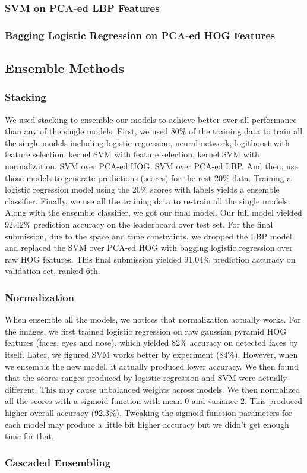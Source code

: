 \subsubsection{SVM on PCA-ed LBP Features}
\subsubsection{Bagging Logistic Regression on PCA-ed HOG Features}
\subsection{Ensemble Methods}
\subsubsection{Stacking}
We used stacking to ensemble our models to achieve better over all performance than any of the single models. First, we used 80\% of the training data to train all the single models including logistic regression, neural network, logitboost with feature selection, kernel SVM with feature selection, kernel SVM with normalization, SVM over PCA-ed HOG, SVM over PCA-ed LBP. And then, use those models to generate predictions (scores) for the rest 20\% data. Training a logistic regression model using the 20\% scores with labels yields a ensemble classifier. Finally, we use all the training data to re-train all the single models. Along with the ensemble classifier, we got our final model. Our full model yielded 92.42\% prediction accuracy on the leaderboard over test set. For the final submission, due to the space and time constraints, we dropped the LBP model and replaced the SVM over PCA-ed HOG with bagging logistic regression over raw HOG features. This final submission yielded 91.04\% prediction accuracy on validation set, ranked 6th.
\subsubsection{Normalization}
When ensemble all the models, we notices that normalization actually works. For the images, we first trained logistic regression on raw gaussian pyramid HOG features (faces, eyes and nose), which yielded 82\% accuracy on detected faces by itself. Later, we figured SVM works better by experiment (84\%). However, when we ensemble the new model, it actually produced lower accuracy. We then found that the scores ranges produced by logistic regression and SVM were actually different. This may cause unbalanced weights across models. We then normalized all the scores with a sigmoid function with mean 0 and variance 2. This produced higher overall accuracy (92.3\%). Tweaking the sigmoid function parameters for each model may produce a little bit higher accuracy but we didn't get enough time for that.
\subsubsection{Cascaded Ensembling}


